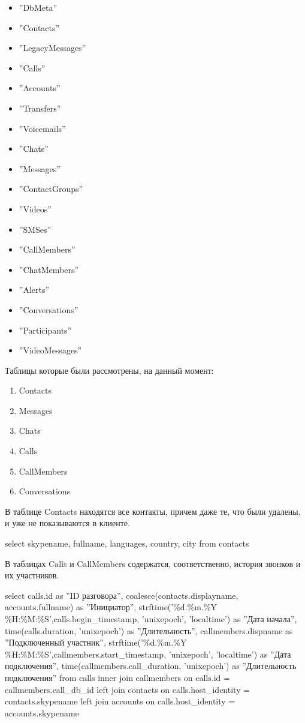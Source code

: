 \begin{itemize}
\item''DbMeta''   
\item''Contacts''   
\item''LegacyMessages''
\item''Calls''     
\item''Accounts''   
\item''Transfers''   
\item''Voicemails''   
\item''Chats''      
\item''Messages''   
\item''ContactGroups''  
\item''Videos''   
\item''SMSes''
\item''CallMembers''   
\item''ChatMembers''   
\item''Alerts''
\item''Conversations''     
\item''Participants''   
\item''VideoMessages''
\end{itemize}

Таблицы которые были рассмотрены, на данный момент:    
\begin{enumerate}
\item Contacts
\item Messages
\item Chats
\item Calls
\item CallMembers
\item Conversations
\end{enumerate}

В таблице Contacts находятся все контакты, причем даже те, что были удалены, и уже не показываются в клиенте.

\noindent select skypename, fullname, languages, country, city from contacts

В таблицах Calls и CallMembers содержатся, соответственно, история звонков и их участников.

\noindent select calls.id as ''ID разговора'', coalesce(contacts.displayname, accounts.fullname) as ''Инициатор'', strftime('\%d.\%m.\%Y \%H:\%M:\%S',calls.begin\_timestamp, 'unixepoch', 'localtime') as ''Дата начала'', time(calls.duration, 'unixepoch') as ''Длительность'', callmembers.dispname as ''Подключенный участник'', strftime('\%d.\%m.\%Y \%H:\%M:\%S',callmembers.start\_timestamp, 'unixepoch', 'localtime') as ''Дата подключения'', time(callmembers.call\_duration, 'unixepoch') as ''Длительность подключения'' from calls inner join callmembers on calls.id = callmembers.call\_db\_id left  join contacts on calls.host\_identity = contacts.skypename left  join accounts on calls.host\_identity = accounts.skypename

